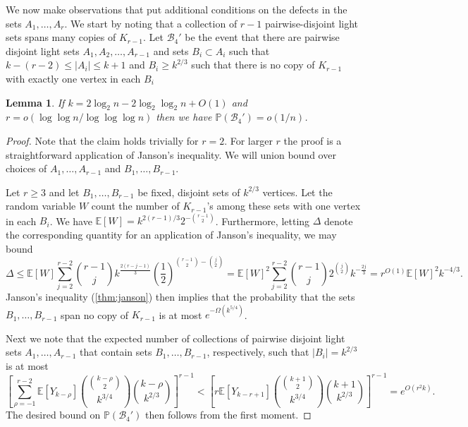 \documentclass[11pt]{article}
\newtheorem{lemma}[theorem]{Lemma}
\theoremstyle{definition}
\theoremstyle{remark}
\newcommand{\EE}{\mathbb{E}}
\newcommand{\PP}{\mathbb{P}}
\newcommand{\cB}{\mathcal{B}}
\begin{document}
We now make observations that put additional conditions on the defects in the
sets $ A_1, \dots, A_r$. We start by noting that a collection of
$r-1$ pairwise-disjoint light sets spans many copies of $ K_{r-1}$. Let $\cB_4'$ be the
event that there are pairwise disjoint light sets $ A_1, A_2, \dots, A_{r-1}$ 
and sets $ B_i \subset A_i$ such that $ k - (r-2) \le |A_i| \le k+1$ and $B_i \ge k^{2/3}$ such that there is no copy of 
$K_{r-1}$ with exactly one vertex in each $B_i$
\begin{lemma} \label{lem:multipartite}
  If $k = 2\log_2 n -2\log_2\log_2 n + O(1)$ and $ r = o(\log\log n / \log\log\log n)$ then we have $ \PP( \cB_4') = o(1/n)$.
\end{lemma}
\begin{proof}
Note that the claim holds trivially for $r=2$. For larger $r$
the proof is a straightforward application of Janson's inequality. We will union bound over choices of $A_{1},\ldots,A_{r-1}$ and $B_1,\ldots,B_{r-1}$.

Let $ r \ge 3$ and let $ B_1, \dots, B_{r-1}$ be fixed, disjoint sets
of $ k^{2/3}$ vertices. Let the random variable $W$ count the number of
$ K_{r-1}$'s among these sets with one vertex in each $ B_{i}$. We have 
$\EE[W] = k^{2(r-1)/3} 2^{-{\binom{r-1}{2}}} $. 
Furthermore, letting $\Delta$ denote the corresponding quantity for an application of Janson's inequality, we may bound
$$ \Delta \le \EE[W] \sum_{ j=2}^{r-2} \binom{r-1}{j} k^{\frac{2(r-j-1)}{3}} \left( \frac{1}{2} \right)^{\binom{r-1}{2} - \binom{j}{2}}
= \EE[W]^2 \sum_{j=2}^{r-2} \binom{r-1}{j} 2^{\binom{j}{2}} k^{-\frac{2j}{3}} 
= r^{O(1)} \EE[W]^2 k^{-4/3}.$$
Janson's inequality (\cref{thm:janson}) then implies that the probability that the sets $ B_1, \dots, B_{r-1}$ span no
copy of $ K_{r-1}$ is at most $ e^{ - \Omega( k^{5/4})}$.

Next we note that the expected number of collections of pairwise disjoint light sets $ A_1, \dots, A_{r-1}$ that contain sets $ B_1, \dots, B_{r-1}$, respectively, such
that $ |B_i| = k^{2/3}$ is at most
\[  \left[ \sum_{\rho=-1}^{r-2} \EE[ Y_{k- \rho}] \binom{ \binom{k - \rho}{2}}{ k^{3/4}}\binom{k- \rho}{k^{2/3}}  \right]^{r-1} <
\left[ r \EE[ Y_{k-r+1}] \binom{ \binom{k+1}{2}}{ k^{3/4}}\binom{k+1}{k^{2/3}}  \right]^{r-1} = e^{ O(r^2k)}. \]
The desired bound on $ \PP( \cB_4')$ then follows from the first moment.
\end{proof}
\end{document}
